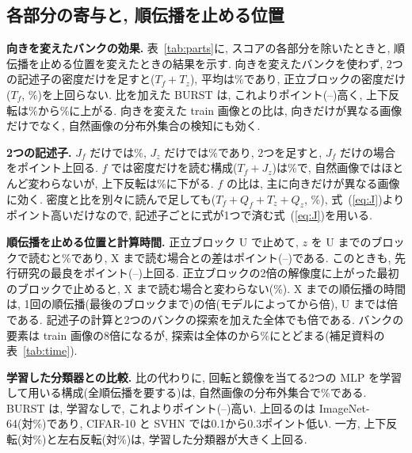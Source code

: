 \documentclass[MIRU,submit]{miru2025j}
\newcommand{\method}{BURST}               %
\renewcommand{\eqref}[1]{(\ref{#1})}
\begin{document}
\subsection{各部分の寄与と, 順伝播を止める位置}
\label{sec:parts}
\textbf{向きを変えたバンクの効果.} 表~\ref{tab:parts}に, スコアの各部分を除いたときと, 順伝播を止める位置を変えたときの結果を示す. 向きを変えたバンクを使わず, 2つの記述子の密度だけを足すと($T_f+T_z$), 平均は\nNoOriT\%であり, 正立ブロックの密度だけ($T_f$, \nDensT\%)を上回らない. 比を加えた \method{} は, これより\nGapNoOriT{}ポイント(\nGapNoOriLoT--\nGapNoOriHiT)高く, 上下反転は\nNoOriUdT\%から\nUdT\%に上がる. 向きを変えた train 画像との比は, 向きだけが異なる画像だけでなく, 自然画像の分布外集合の検知にも効く.

\textbf{2つの記述子.} $J_f$ だけでは\nOnlyJfT\%, $J_z$ だけでは\nOnlyJzT\%であり, 2つを足すと, $J_f$ だけの場合を\nGapOnlyJfT{}ポイント上回る. $f$ では密度だけを読む構成($T_f+J_z$)は\nTfJzT\%で, 自然画像ではほとんど変わらないが, 上下反転は\nTfJzUdT\%に下がる. $f$ の比は, 主に向きだけが異なる画像に効く. 密度と比を別々に読んで足しても($T_f+Q_f+T_z+Q_z$, \nFourT\%), 式~\eqref{eq:J}より\nGapFourT{}ポイント高いだけなので, 記述子ごとに式が1つで済む式~\eqref{eq:J}を用いる.

\textbf{順伝播を止める位置と計算時間.} 正立ブロック U で止めて, $z$ を U までのブロックで読むと\nStopUT\%であり, X まで読む場合との差は\nGapStopUT{}ポイント(\nGapStopULoT--\nGapStopUHiT)である. このときも, 先行研究の最良を\nGapStopUPriorT{}ポイント(\nGapStopUPriorLoT--\nGapStopUPriorHiT)上回る. 正立ブロックの2倍の解像度に上がった最初のブロックで止めると, X まで読む場合と変わらない(\nStopAT\%). X までの順伝播の時間は, 1回の順伝播(最後のブロックまで)の\nPassX{}倍(モデルによって\nPassXMin{}から\nPassXMax{}倍), U までは\nPassU{}倍である. 記述子の計算と2つのバンクの探索を加えた全体でも\nAllX{}倍である. バンクの要素は train 画像の8倍になるが, 探索は全体の\nSearchShareMin{}から\nSearchShareMax\%にとどまる(補足資料の表~\ref{tab:time}).

\textbf{学習した分類器との比較.} 比の代わりに, 回転と鏡像を当てる2つの MLP を学習して用いる構成(全順伝播を要する)は, 自然画像の分布外集合で\nTrainedT\%である. \method{} は, 学習なしで, これより\nGapTrainedT{}ポイント(\nGapTrainedLoT--\nGapTrainedHiT)高い. 上回るのは ImageNet-64(\nOursInT{}対\nTrainedInT\%)であり, CIFAR-10 と SVHN では0.1から0.3ポイント低い. 一方, 上下反転(\nUdT{}対\nTrainedUdT\%)と左右反転(\nHfT{}対\nTrainedHfT\%)は, 学習した分類器が大きく上回る.
\end{document}
